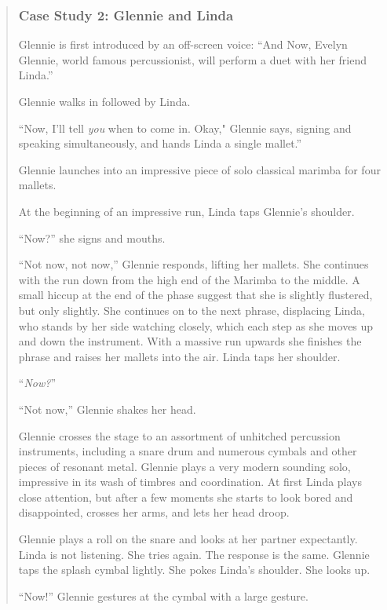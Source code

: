 \documentclass[12pt,letterpaper]{article}
\begin{document}
	\begin{quote}
	
	\subsubsection*{Case Study 2: Glennie and Linda}
	
	Glennie is first introduced by an off-screen voice: ``And Now, Evelyn 
	Glennie, world famous percussionist, will perform a duet with her 
	friend Linda.''

	Glennie walks in followed by Linda.  

	``Now, I'll tell \textit{you} when to come in. Okay," Glennie says, 
	signing and 
	speaking simultaneously, and hands Linda a single mallet.''  

	Glennie launches into an impressive piece of solo classical marimba for 
	four mallets. 

	At the beginning of an impressive run, Linda taps Glennie's shoulder.

	``Now?'' she signs and mouths.

	``Not now, not now,'' Glennie responds, lifting her mallets. She continues
	 with the run down from the high end of the Marimba to the middle. A 
	small hiccup at the end of the phase suggest that she is slightly 
	flustered, but only slightly. She continues on to the next phrase, 
	displacing Linda, who stands by her side watching closely, which each 
	step as she moves up and down the instrument. With a massive run upwards
	she finishes the phrase and raises her mallets into the air. Linda taps 
	her shoulder.

	``\textit{Now?}'' 

	``Not now,'' Glennie shakes her head. 

	Glennie crosses the stage to an assortment of unhitched percussion 
	instruments, including a snare drum and numerous cymbals and other 
	pieces of resonant metal. Glennie plays a very modern sounding solo, 
	impressive in its wash of timbres and coordination. At first Linda 
	plays close attention, but after a few moments she starts to look bored 
	and disappointed, crosses her arms, and lets her head droop.

	Glennie plays a roll on the snare and looks at her partner expectantly. 
	Linda is not listening. She tries again. The response is the same. 
	Glennie taps the splash cymbal lightly. She pokes Linda's shoulder. She 
	looks up.

	``Now!'' Glennie gestures at the cymbal with a large gesture. 


\end{quote}
\end{document}
